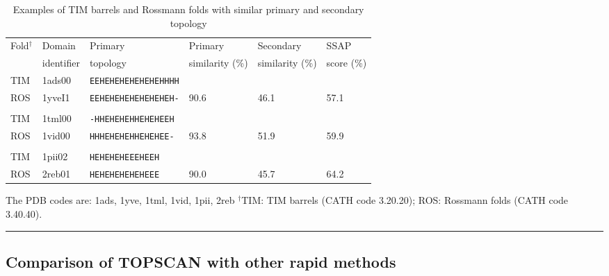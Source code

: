\documentclass{article}
\begin{document}
\begin{table}
\caption{\label{tab:timros} Examples of TIM barrels and Rossmann folds
with similar primary and secondary topology}
\begin{center}
\begin{tabularx}{\linewidth}{llXlll}\hline
Fold$^{\dag}$ %
     & Domain     & Primary                   & Primary         & Secondary       & SSAP       \\
     & identifier & topology                  & similarity (\%) & similarity (\%) & score (\%) \\ \hline
TIM  & 1ads00     & {\tt EEHEHEHEHEHEHEHHHH}  &                 &                 &            \\
ROS  & 1yveI1     & {\tt EEHEHEHEHEHEHEHEH-}  & 90.6            & 46.1            & 57.1       \\
     &            &                           &                 &                 &            \\
TIM  & 1tml00     & {\tt -HHEHEHEHHEHEHEEH}   &                 &                 &            \\
ROS  & 1vid00     & {\tt HHHEHEHEHHEHEHEE-}   & 93.8            & 51.9            & 59.9       \\
     &            &                           &                 &                 &            \\
TIM  & 1pii02     & {\tt HEHEHEHEEEHEEH}      &                 &                 &            \\
ROS  & 2reb01     & {\tt HEHEHEHEHEHEEE}      & 90.0            & 45.7            & 64.2       \\ \hline
\end{tabularx}
\end{center}
The PDB codes are:
1ads\protect\cite{wilson:1ads}, 
1yve\protect\cite{biou:1yve},
1tml\protect\cite{spezio:1tml},
1vid\protect\cite{vidgren:1vid},
1pii\protect\cite{wilmanns:1pii},
2reb\protect\cite{story:2reb}
$^{\dag}$TIM: TIM barrels (CATH code 3.20.20); ROS: Rossmann folds (CATH code 3.40.40).
\hrule
\end{table}




\subsection{Comparison of TOPSCAN with other rapid methods}
\end{document}
